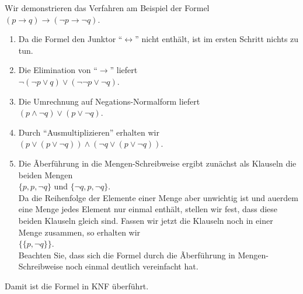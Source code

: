 Wir demonstrieren das Verfahren am Beispiel der Formel\\[0.2cm]
\hspace*{1.3cm} $(p \rightarrow q) \rightarrow (\neg p \rightarrow \neg q)$.
\begin{enumerate}
\item Da die Formel den Junktor ``$\leftrightarrow$'' nicht enth\"{a}lt,
      ist im ersten Schritt nichts zu tun.
\item Die Elimination von ``$\rightarrow$'' liefert \\[0.2cm]
      \hspace*{1.3cm} $\neg (\neg p \vee q) \vee (\neg \neg p \vee \neg q)$.
\item Die Umrechnung auf Negations-Normalform liefert \\[0.2cm]
      \hspace*{1.3cm} $(p \wedge \neg q) \vee (p \vee \neg q)$.
\item Durch ``Ausmultiplizieren'' erhalten wir \\[0.2cm]
      \hspace*{1.3cm} $(p \vee (p \vee \neg q)) \wedge (\neg q \vee (p \vee \neg q))$.
\item Die Ãberf\"{u}hrung in die Mengen-Schreibweise ergibt zun\"{a}chst als Klauseln die beiden Mengen \\[0.2cm]
      \hspace*{1.3cm} $\{p, p, \neg q\}$ \quad und \quad $\{\neg q,  p,  \neg q\}$. \\[0.2cm]
      Da die Reihenfolge der Elemente einer Menge aber unwichtig ist und au\3erdem eine Menge
      jedes Element nur einmal enth\"{a}lt, stellen wir fest, dass diese beiden Klauseln gleich sind.
      Fassen wir jetzt die Klauseln noch in einer Menge zusammen, so erhalten wir \\[0.2cm]
      \hspace*{1.3cm} $\bigl\{ \{p, \neg q\} \bigr\}$. \\[0.2cm]
      Beachten Sie, dass sich die Formel durch die Ãberf\"{u}hrung in 
      Mengen-Schreibweise noch einmal deutlich vereinfacht hat.
\end{enumerate}
Damit ist die Formel in KNF \"{u}berf\"{u}hrt.

